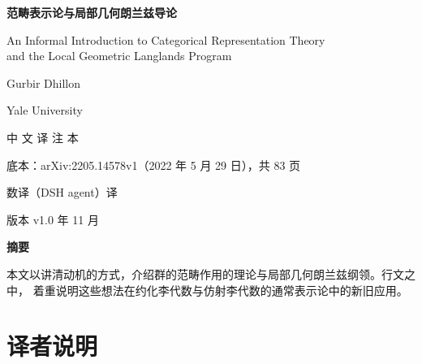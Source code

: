 \documentclass[UTF8, a4paper, 12pt, fontset=fandol, scheme=chinese]{ctexart}
\begin{document}
\begin{titlepage}
\centering
\vspace*{3.2cm}

{\LARGE\bfseries 范畴表示论与局部几何朗兰兹导论\par}

\vspace{0.9cm}
{\large An Informal Introduction to Categorical Representation Theory\\
and the Local Geometric Langlands Program\par}

\vspace{2.2cm}
{\large Gurbir Dhillon\par}
\vspace{0.35cm}
{\normalsize Yale University\par}

\vspace{2.4cm}
{\large 中 文 译 注 本\par}

\vspace{0.5cm}
{\normalsize 底本：arXiv:2205.14578v1（2022 年 5 月 29 日），共 83 页\par}

\vfill
{\normalsize 数译（DSH agent）译\par}
{\normalsize 版本 v1.0 年 11 月\par}
\vspace{1.2cm}
\end{titlepage}

\vspace*{0.5cm}
\begin{center}
{\large\bfseries 摘\quad 要}
\end{center}
\vspace{0.3cm}

\noindent 本文以讲清动机的方式，介绍群的范畴作用的理论与局部几何朗兰兹纲领。行文之中，
着重说明这些想法在约化李代数与仿射李代数的通常表示论中的新旧应用。

\vspace{0.8cm}

\newpage

\section*{译者说明}
\end{document}
